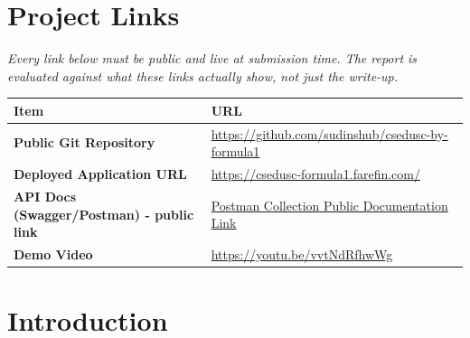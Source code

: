 \documentclass[12pt, a4paper]{article}
\begin{document}
\cleardoublepage

\setcounter{page}{2}

\section*{Project Links}

\textit{Every link below must be public and live at submission time. The report is evaluated against what these links actually show, not just the write-up.}

\vspace{0.8cm}

\begin{table}[h!]
\centering
\renewcommand{\arraystretch}{1.8}
\begin{tabular}{|p{5.5cm}|p{9.5cm}|}
\hline
{} \color{white}\textbf{Item} & \color{white}\textbf{URL} \\ \hline
\textbf{Public Git Repository} & \url{https://github.com/sudinshub/csedusc-by-formula1} \\ \hline
\textbf{Deployed Application URL} & \url{https://csedusc-formula1.farefin.com/} \\ \hline
\textbf{API Docs (Swagger/Postman) - public link} & \href{https://descent-module-engineer-15168815-s-team.postman.co/workspace/My-Workspace~a965dbec-d881-435e-87ca-f288339c08f7/collection/27685398-768f650e-3d9c-4d1c-99d4-b878dc97515d?action=share&creator=27685398}{Postman Collection Public Documentation Link} \\ \hline
\textbf{Demo Video} & \url{https://youtu.be/vvtNdRfhwWg} \\ \hline
\end{tabular}
\end{table}

\cleardoublepage

\tableofcontents
\cleardoublepage

\setcounter{page}{5}

\section{Introduction}
\end{document}
